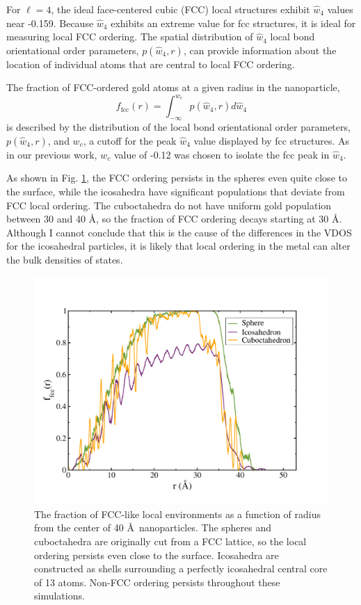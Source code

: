 For $\ell=4$, the ideal face-centered cubic (FCC) local structures
exhibit $\hat{w}_4$ values near -0.159. Because $\hat{w}_4$ exhibits
an extreme value for fcc structures, it is ideal for measuring local
FCC ordering. The spatial distribution of $\hat{w}_4$ local bond
orientational order parameters, $p(\hat{w}_4 , r)$, can provide
information about the location of individual atoms that are central to
local FCC ordering.

The fraction of FCC-ordered gold atoms at a given radius in the
nanoparticle,
\begin{equation}
        f_\mathrm{fcc}(r) = \int_{-\infty}^{w_c} p(\hat{w}_4, r) d \hat{w}_4
\end{equation}
is described by the distribution of the local bond orientational order
parameters, $p(\hat{w}_4, r)$, and $w_c$, a cutoff for the peak
$\hat{w}_4$ value displayed by fcc structures. As in our previous
work,\cite{Stocker2016} $w_c$ value of -0.12 was chosen to isolate the
fcc peak in $\hat{w}_4$.

As shown in Fig. \ref{fig:struct-bowr}, the FCC ordering persists in
the spheres even quite close to the surface, while the icosahedra have
significant populations that deviate from FCC local ordering.  The
cuboctahedra do not have uniform gold population between 30 and 40
\AA, so the fraction of FCC ordering decays starting at 30 \AA.
Although I cannot conclude that this is the cause of the differences
in the VDOS for the icosahedral particles, it is likely that local
ordering in the metal can alter the bulk densities of states.

\begin{figure}[!htb]
        \includegraphics[width=5in]{figures/struct-bowr.pdf}
        \caption{The fraction of FCC-like local environments as a
          function of radius from the center of 40 \AA\ nanoparticles.
          The spheres and cuboctahedra are originally cut from a FCC
          lattice, so the local ordering persists even close to the
          surface.  Icosahedra are constructed as shells surrounding a
          perfectly icosahedral central core of 13 atoms. Non-FCC
          ordering persists throughout these simulations.}
        \label{fig:struct-bowr}
 \end{figure}

